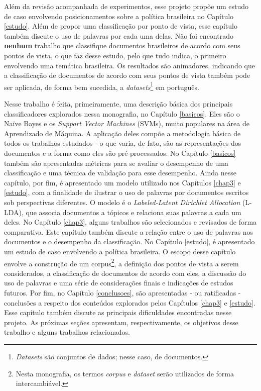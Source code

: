 Além da revisão acompanhada de experimentos, esse projeto propõe um estudo de caso envolvendo posicionamentos sobre a política brasileira no Capítulo \ref{estudo}. Além de propor uma classificação por ponto de vista, esse capítulo também discute o uso de palavras por cada uma delas. Não foi encontrado \textbf{nenhum} trabalho que classifique documentos brasileiros de acordo com seus pontos de vista, o que faz desse estudo, pelo que tudo indica, o primeiro envolvendo uma temática brasileira. Os resultados são animadores, indicando que a classificação de documentos de acordo com seus pontos de vista também pode ser aplicada, de forma bem sucedida, a \emph{datasets}\footnote{\emph{Datasets} são conjuntos de dados; nesse caso, de documentos.} em português.


Nesse trabalho é feita, primeiramente, uma descrição básica dos principais classificadores explorados nessa monografia, no Capítulo \ref{basicos}. Eles são o Naïve Bayes e os \emph{Support Vector Machines} (SVMs), muito populares na área de Aprendizado de Máquina. A aplicação deles compõe a metodologia básica de todos os trabalhos estudados - o que varia, de fato, são as representações dos documentos e a forma como eles são pré-processados. No Capítulo \ref{basicos} também são apresentadas métricas para se avaliar o desempenho de uma classificação e uma técnica de validação para esse desempenho. Ainda nesse capítulo, por fim, é apresentado um modelo utilizado nos Capítulos \ref{chap3} e \ref{estudo}, com a finalidade de ilustrar o uso de palavras por documentos escritos sob perspectivas diferentes. O modelo é o \emph{Labeled-Latent Dirichlet Allocation} (L-LDA), que associa documentos a tópicos e relaciona suas palavras a cada um deles. No Capítulo \ref{chap3}, alguns trabalhos são selecionados e revisados de forma comparativa. Este capítulo também discute a relação entre o uso de palavras nos documentos e o desempenho da classificação. No Capítulo \ref{estudo}, é apresentado um estudo de caso envolvendo a política brasileira. O escopo desse capítulo envolve a construção de um corpus\footnote{Nesta monografia, os termos \emph{corpus} e \emph{dataset} serão utilizados de forma intercambiável.}, a definição dos pontos de vista a serem considerados, a classificação de documentos de acordo com eles, a discussão do uso de palavras e uma série de considerações finais e indicações de estudos futuros. Por fim, no Capítulo \ref{conclusoes}, são apresentadas - ou ratificadas - conclusões a respeito dos conteúdos explorados pelos Capítulos \ref{chap3} e \ref{estudo}. Esse capítulo também discute as principais dificuldades encontradas nesse projeto. As próximas seções apresentam, respectivamente, os objetivos desse trabalho e alguns trabalhos relacionados.


